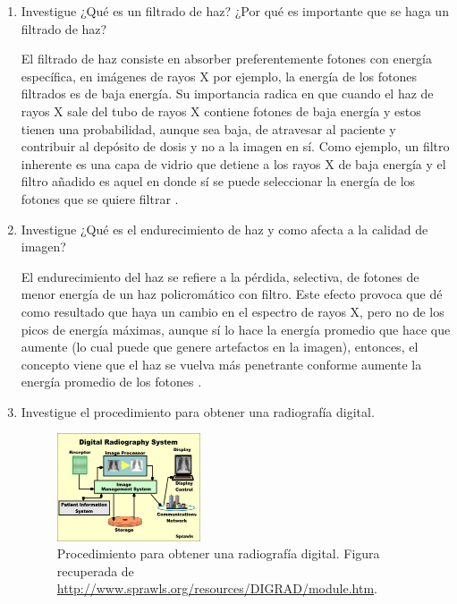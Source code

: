 \begin{enumerate}[1.]
\item  Investigue ¿Qué es un filtrado de haz? ¿Por qué es importante que se haga un filtrado de haz?

El filtrado de haz consiste en absorber preferentemente fotones con energía específica, en imágenes de rayos X por ejemplo, la energía de los fotones filtrados es de baja energía. Su importancia radica en que cuando el haz de rayos X sale del tubo de rayos X contiene fotones de baja energía y estos tienen una probabilidad, aunque sea baja, de atravesar al paciente y contribuir al depósito de dosis y no a la imagen en sí. Como ejemplo, un filtro inherente es una capa de vidrio que detiene a los rayos X de baja energía y el filtro añadido es aquel en donde sí se puede seleccionar la energía de los fotones que se quiere filtrar \citep{alpen,russ}.











\item  Investigue ¿Qué es el endurecimiento de haz y como afecta a la calidad de imagen?


El endurecimiento del haz se refiere a la pérdida, selectiva, de fotones de menor energía de un haz policromático con filtro. Este efecto provoca que dé como resultado que haya un cambio en el espectro de rayos X, pero no de los picos de energía máximas, aunque sí lo hace la energía promedio que hace que aumente (lo cual puede que genere artefactos en la imagen), entonces, el concepto viene que el haz se vuelva más penetrante conforme aumente la energía promedio de los fotones \citep{edwin}.





\pagebreak



\item  Investigue el procedimiento para obtener una radiografía digital.


\begin{figure}[!ht]
  \center
  \includegraphics[width=0.4\textwidth]{figuras/p7.jpg}
  \caption{Procedimiento para obtener una radiografía digital. Figura recuperada de \url{http://www.sprawls.org/resources/DIGRAD/module.htm}.}
  \label{fig:p7}
\end{figure}


\end{enumerate}
